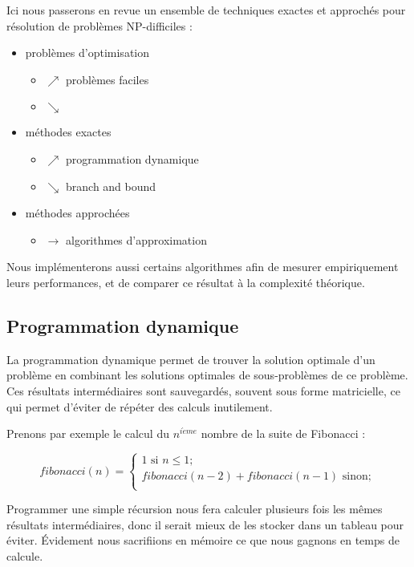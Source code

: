 Ici nous passerons en revue un ensemble de techniques exactes et approchés pour 
résolution de problèmes NP-difficiles :

\begin{itemize}
  \item problèmes d'optimisation 
  \begin{itemize}
    \item[] $\nearrow$ problèmes faciles
    \item[] $\searrow$ 
  \end{itemize}
	\item méthodes exactes 
	\begin{itemize}
		\item[] $\nearrow$ programmation dynamique
		\item[] $\searrow$ branch and bound
	\end{itemize}
	\item méthodes approchées
	\begin{itemize}
		\item[] $\longrightarrow$ algorithmes d'approximation
	\end{itemize}
\end{itemize}

Nous implémenterons aussi certains algorithmes afin de mesurer empiriquement leurs performances, et de comparer ce résultat à la complexité théorique.

\subsection{Programmation dynamique}
La programmation dynamique permet de trouver la solution optimale d'un
problème en combinant les solutions optimales de sous-problèmes de ce
problème. Ces résultats intermédiaires sont sauvegardés, souvent sous
forme matricielle, ce qui permet d'éviter de répéter des calculs inutilement.

Prenons par exemple le calcul du $n^{i\grave{e}me}$ nombre de la suite de Fibonacci :

\begin{equation}
fibonacci(n) = 
\begin{cases}
1 \text{ si } n \leq 1; \\
fibonacci(n-2) + fibonacci(n-1) \text{ sinon};\\
\end{cases}
\end{equation}

Programmer une simple récursion nous fera calculer plusieurs fois les mêmes résultats intermédiaires, donc il serait mieux de les stocker dans un tableau pour éviter. Évidement  nous sacrifiions en mémoire ce que nous gagnons en temps de calcule.


